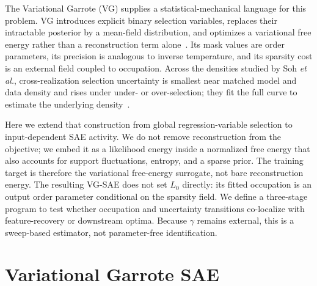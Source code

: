 \documentclass[aps,pre,reprint,superscriptaddress,amsmath,amssymb,nofootinbib]{revtex4-2}
\begin{document}
The Variational Garrote (VG) supplies a statistical-mechanical language for
this problem.  VG introduces explicit binary selection variables, replaces
their intractable posterior by a mean-field distribution, and optimizes a
variational free energy rather than a reconstruction term
alone~\cite{soh2025variational}.  Its mask values are order parameters, its
precision is analogous to inverse temperature, and its sparsity cost is an
external field coupled to occupation.  Across the densities studied by Soh
\emph{et al.}, cross-realization selection uncertainty is smallest near matched
model and data density and rises under under- or over-selection; they fit the
full curve to estimate the underlying density~\cite{soh2025variational}.

Here we extend that construction from global regression-variable selection to
input-dependent SAE activity.  We do not remove reconstruction from the
objective; we embed it as a likelihood energy inside a normalized free energy
that also accounts for support fluctuations, entropy, and a sparse prior.  The
training target is therefore the variational free-energy surrogate, not bare
reconstruction energy.  The resulting VG-SAE does not set $L_0$ directly: its
fitted occupation is an output order parameter conditional on the sparsity
field.  We define a three-stage program to test whether occupation and
uncertainty transitions co-localize with feature-recovery or downstream optima.
Because $\gamma$ remains external, this is a sweep-based estimator, not
parameter-free identification.

\section{Variational Garrote SAE}
\label{sec:method}
\end{document}
